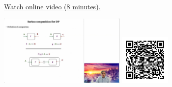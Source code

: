 
\begin{minipage}{10cm}
    \href{https://act4e-spring21.netlify.app/videos/spring2021-functorial-comp-b:solving-queries:solving-series.html}{Watch online video (8 minutes).}
        
    \href{https://act4e-spring21.netlify.app/videos/spring2021-functorial-comp-b:solving-queries:solving-series.html}{\includegraphics[height=3.5cm]{spring2021-functorial-comp-b:solving-queries:solving-series/thumbnails.jpg}}
    \href{https://act4e-spring21.netlify.app/videos/spring2021-functorial-comp-b:solving-queries:solving-series.html}{\includegraphics[height=2.5cm]{spring2021-functorial-comp-b:solving-queries:solving-series/qrcode.png}}
\end{minipage}
